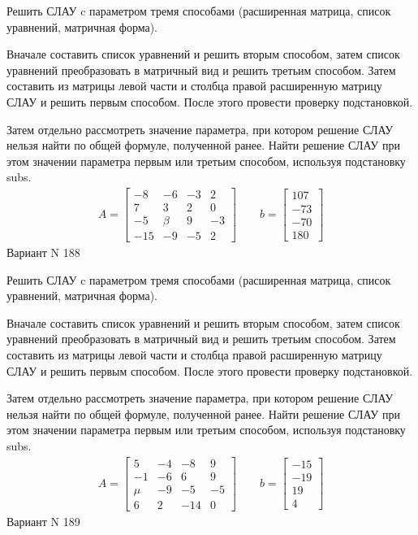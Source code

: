 \documentclass[11pt]{report}
\begin{document}
Решить СЛАУ c параметром тремя способами (расширенная матрица, список уравнений, матричная форма).

Вначале составить список уравнений и решить вторым способом,
затем список уравнений преобразовать в матричный вид и решить третьим способом.
Затем составить из матрицы левой части и столбца правой расширенную матрицу СЛАУ и решить первым способом.
После этого провести проверку подстановкой.

Затем отдельно рассмотреть значение параметра, при котором решение СЛАУ нельзя найти по общей формуле,
полученной ранее.
Найти решение СЛАУ при этом значении параметра первым или третьим способом, используя подстановку subs.
\begin{align*}
    A = \left[\begin{matrix}-8 & -6 & -3 & 2\\7 & 3 & 2 & 0\\-5 & \beta & 9 & -3\\-15 & -9 & -5 & 2\end{matrix}\right]
\qquad b = \left[\begin{matrix}107\\-73\\-70\\180\end{matrix}\right]
\end{align*}
\newpage
Вариант N 188


Решить СЛАУ c параметром тремя способами (расширенная матрица, список уравнений, матричная форма).

Вначале составить список уравнений и решить вторым способом,
затем список уравнений преобразовать в матричный вид и решить третьим способом.
Затем составить из матрицы левой части и столбца правой расширенную матрицу СЛАУ и решить первым способом.
После этого провести проверку подстановкой.

Затем отдельно рассмотреть значение параметра, при котором решение СЛАУ нельзя найти по общей формуле,
полученной ранее.
Найти решение СЛАУ при этом значении параметра первым или третьим способом, используя подстановку subs.
\begin{align*}
    A = \left[\begin{matrix}5 & -4 & -8 & 9\\-1 & -6 & 6 & 9\\\mu & -9 & -5 & -5\\6 & 2 & -14 & 0\end{matrix}\right]
\qquad b = \left[\begin{matrix}-15\\-19\\19\\4\end{matrix}\right]
\end{align*}
\newpage
Вариант N 189
\end{document}
